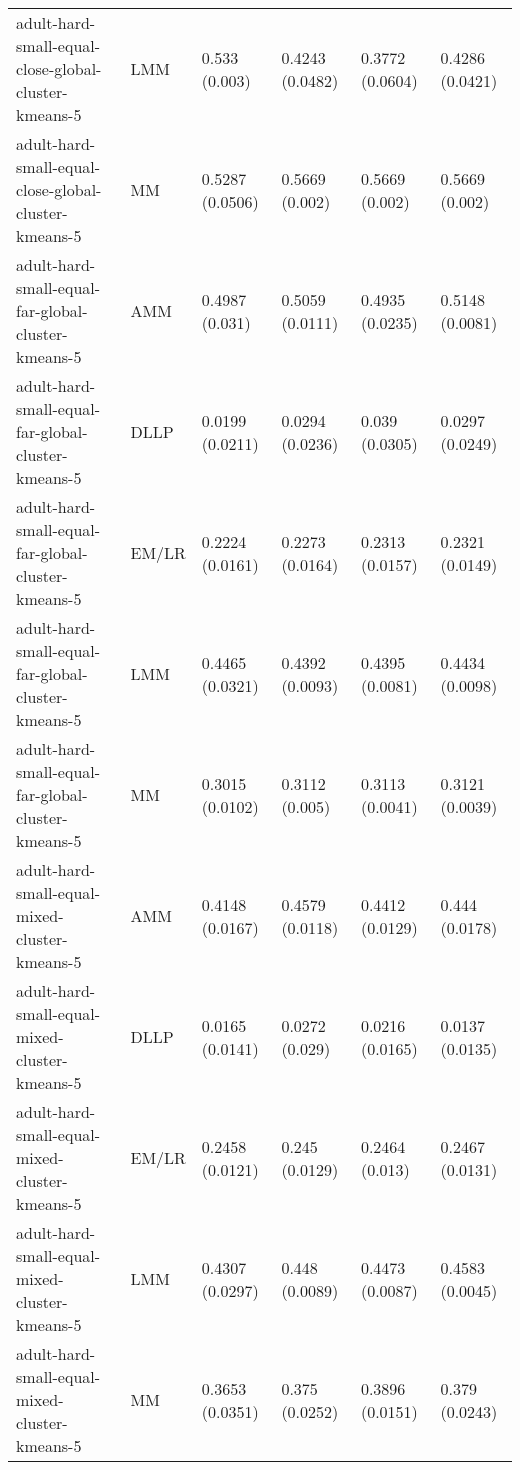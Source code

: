 \begin{longtable}{llllll}
                                   adult-hard-small-equal-close-global-cluster-kmeans-5 &       LMM &   0.533 (0.003) &  0.4243 (0.0482) &   0.3772 (0.0604) &     0.4286 (0.0421) \\
                                   adult-hard-small-equal-close-global-cluster-kmeans-5 &        MM & 0.5287 (0.0506) &   0.5669 (0.002) &    0.5669 (0.002) &      0.5669 (0.002) \\
                                     adult-hard-small-equal-far-global-cluster-kmeans-5 &       AMM &  0.4987 (0.031) &  0.5059 (0.0111) &   0.4935 (0.0235) &     0.5148 (0.0081) \\
                                     adult-hard-small-equal-far-global-cluster-kmeans-5 &      DLLP & 0.0199 (0.0211) &  0.0294 (0.0236) &    0.039 (0.0305) &     0.0297 (0.0249) \\
                                     adult-hard-small-equal-far-global-cluster-kmeans-5 &     EM/LR & 0.2224 (0.0161) &  0.2273 (0.0164) &   0.2313 (0.0157) &     0.2321 (0.0149) \\
                                     adult-hard-small-equal-far-global-cluster-kmeans-5 &       LMM & 0.4465 (0.0321) &  0.4392 (0.0093) &   0.4395 (0.0081) &     0.4434 (0.0098) \\
                                     adult-hard-small-equal-far-global-cluster-kmeans-5 &        MM & 0.3015 (0.0102) &   0.3112 (0.005) &   0.3113 (0.0041) &     0.3121 (0.0039) \\
                                          adult-hard-small-equal-mixed-cluster-kmeans-5 &       AMM & 0.4148 (0.0167) &  0.4579 (0.0118) &   0.4412 (0.0129) &      0.444 (0.0178) \\
                                          adult-hard-small-equal-mixed-cluster-kmeans-5 &      DLLP & 0.0165 (0.0141) &   0.0272 (0.029) &   0.0216 (0.0165) &     0.0137 (0.0135) \\
                                          adult-hard-small-equal-mixed-cluster-kmeans-5 &     EM/LR & 0.2458 (0.0121) &   0.245 (0.0129) &    0.2464 (0.013) &     0.2467 (0.0131) \\
                                          adult-hard-small-equal-mixed-cluster-kmeans-5 &       LMM & 0.4307 (0.0297) &   0.448 (0.0089) &   0.4473 (0.0087) &     0.4583 (0.0045) \\
                                          adult-hard-small-equal-mixed-cluster-kmeans-5 &        MM & 0.3653 (0.0351) &   0.375 (0.0252) &   0.3896 (0.0151) &      0.379 (0.0243) \\

\end{longtable}

